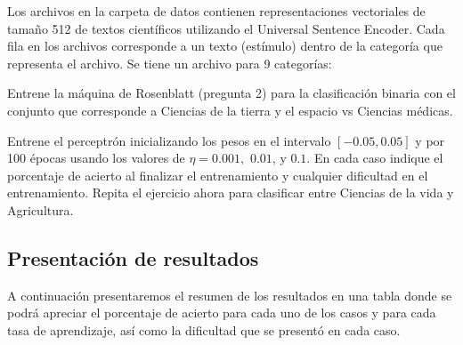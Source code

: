 \documentclass{article}
\theoremstyle{mytheoremstyle}
\theoremstyle{mytheoremstyle}
\theoremstyle{myproblemstyle}
\begin{document}
Los archivos en la carpeta de datos contienen representaciones vectoriales de tamaño 512 de textos científicos utilizando el Universal Sentence Encoder. Cada fila en los archivos corresponde a un texto (estímulo) dentro de la categoría que representa el archivo. Se tiene un archivo para 9 categorías:

Entrene la máquina de Rosenblatt (pregunta 2) para la clasificación binaria con el conjunto que corresponde a Ciencias de la tierra y el espacio vs Ciencias médicas.

Entrene el perceptrón inicializando los pesos en el intervalo $[-0.05, 0.05]$ y por 100 épocas usando los valores de $\eta = 0.001,$ $0.01$, y $0.1$. En cada caso indique el porcentaje de acierto al finalizar el entrenamiento y cualquier dificultad en el entrenamiento. Repita el ejercicio ahora para clasificar entre Ciencias de la vida y Agricultura.

\subsection{Presentación de resultados}

A continuación presentaremos el resumen de los resultados en una tabla donde se podrá apreciar el porcentaje de acierto para cada uno de los casos y para cada tasa de aprendizaje, así como la dificultad que se presentó en cada caso.
\end{document}
